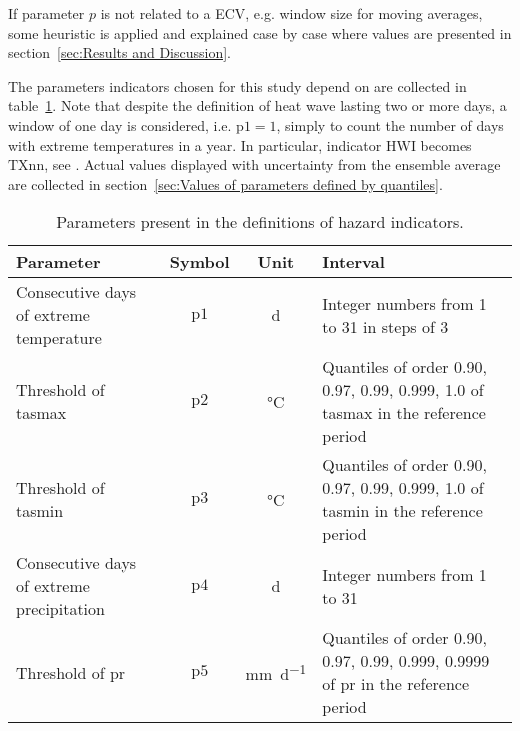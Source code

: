 If parameter $p$ is not related to a \gls{ECV}, e.g. window size for moving averages, some heuristic is applied and explained case by case where values are presented in section~\ref{sec:Results and Discussion}.

The parameters indicators chosen for this study depend on are collected in table~\ref{tab:indicators_parameters}. Note that despite the definition of heat wave lasting two or more days, a window of one day is considered, i.e. $\mathrm{p1} = 1$, simply to count the number of days with extreme temperatures in a year. In particular, indicator $\mathrm{HWI}$ becomes $\mathrm{TXnn}$, see \cite[2209]{2021GutierrezAnnexVI}.
Actual values displayed with uncertainty from the ensemble average are collected in section~\ref{sec:Values of parameters defined by quantiles}.

\begin{table}
  \renewcommand*{\arraystretch}{1.5}
  \centering
  \caption{Parameters present in the definitions of hazard indicators.}
  \label{tab:indicators_parameters}
  \begin{tabular}{p{}ccp{}}
    Parameter                                 & Symbol        & Unit                        & Interval                                                                                     \\
    \hline
    Consecutive days of extreme temperature   & $\mathrm{p1}$ & \unit{\day}                 & Integer numbers from 1 to 31 in steps of 3                                                   \\  %
    Threshold of \gls{tasmax}                 & $\mathrm{p2}$ & \unit{\degreeCelsius}       & Quantiles of order 0.90, 0.97, 0.99, 0.999, 1.0 of \gls{tasmax} in the reference period      \\
    Threshold of \gls{tasmin}                 & $\mathrm{p3}$ & \unit{\degreeCelsius}       & Quantiles of order 0.90, 0.97, 0.99, 0.999, 1.0 of \gls{tasmin} in the reference period      \\
    Consecutive days of extreme precipitation & $\mathrm{p4}$ & \unit{\day}                 & Integer numbers from 1 to 31                                                                 \\  %
    Threshold of \gls{pr}                     & $\mathrm{p5}$ & \unit{\milli\metre\per\day} & Quantiles of order 0.90, 0.97, 0.99, 0.999, 0.9999 of \gls{pr} in the reference period       \\
  \end{tabular}
\end{table}



